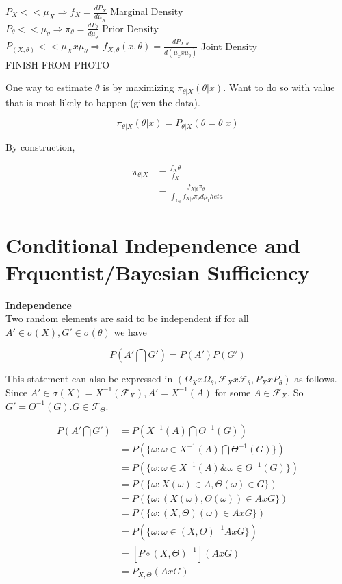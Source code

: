 \documentclass[11pt,fleqn]{book} %
\begin{document}
$P_X << \mu_X \Rightarrow f_X = \frac{d P_X}{d\mu_X}$ Marginal Density\\
$P_\theta << \mu_\theta \Rightarrow \pi_\theta = \frac{d P_\theta}{d\mu_\theta}$ Prior Density\\
$P_(X, \theta) << \mu_X x \mu_\theta \Rightarrow f_{X, \theta} (x, \theta) = \frac{d P_{X, \theta}}{d(\mu_x x \mu_\theta)}$ Joint Density\\


FINISH FROM PHOTO


One way to estimate $\theta$ is by maximizing $\pi_{\theta|X}(\theta|x)$. Want to do so with value that is most likely to happen (given the data). 

		$$\pi_{\theta|X} (\theta|x) = P_{\theta|X}(\theta = \theta | x) $$

By construction, 

		\begin{align*}
			\pi_{\theta|X} &= \frac{f_X\theta}{f_X}\\
				&= \frac{f_{X|\theta}\pi_\theta}{\int_{\Omega_\theta} f_{X|\theta} \pi_\theta d\mu_theta}
		\end{align*}


\section{Conditional Independence and Frquentist/Bayesian Sufficiency}


\textbf{Independence}\\

Two random elements are said to be independent if for all $A' \in \sigma(X), G' \in \sigma(\theta)$ we have

		$$P(A' \bigcap G') = P(A')P(G') $$

This statement can also be expressed in $(\Omega_X x \Omega_\theta, \mathcal{F}_X x \mathcal{F}_\theta, P_X x P_\theta)$ as follows. \\

Since $A' \in \sigma(X) = X^{-1} (\mathcal{F}_X), A' = X^{-1}(A)$ for some $A \in \mathcal{F}_X$. So $G' = \Theta^{-1}(G). G \in \mathcal{F}_\Theta$. 

		\begin{align*}
			P(A' \bigcap G') &= P(X^{-1}(A) \bigcap \Theta^{-1}(G) )\\
				&=P(\{ \omega: \omega \in  X^{-1}(A) \bigcap \Theta^{-1}(G)\} )\\
				&=P(\{ \omega: \omega \in  X^{-1}(A) \& \omega \in \Theta^{-1}(G)\} )\\
				&=P(\{ \omega: X(\omega) \in A, \Theta(\omega) \in G\} )\\
				&=P(\{ \omega:( X(\omega),  \Theta(\omega)) \in A x G\} )\\
				&=P(\{ \omega:( X, \Theta)(\omega) \in A x G\} )\\
				&=P(\{ \omega:\omega \in( X, \Theta)^{-1} A x G\} )\\
				&=[P \circ ( X, \Theta)^{-1} ](A x G)\\
				&=P_{X, \Theta}(A x G)
		\end{align*}
\end{document}
